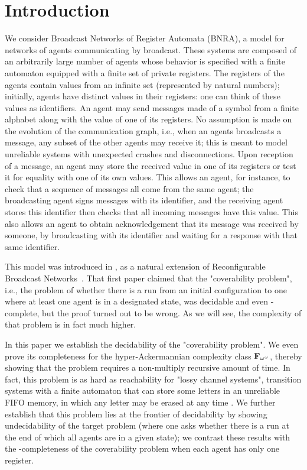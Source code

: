\section{Introduction}

We consider Broadcast Networks of Register Automata (BNRA), a model for networks of agents communicating by broadcast. These systems are composed of an arbitrarily large number of agents whose behavior is specified with a finite automaton equipped with a finite set of private registers. The registers of the agents contain values from an infinite set (represented by natural numbers); initially, agents have distinct values in their registers: one can think of these values as identifiers. An agent may send messages made of a symbol from a finite alphabet along with the value of one of its registers. No assumption is made on the evolution of the communication graph, i.e., when an agents broadcasts a message, any subset of the other agents may receive it; this is meant to model unreliable systems with unexpected crashes and disconnections. Upon reception of a message, an agent may store the received value in one of its registers or test it for equality with one of its own values. 
This allows an agent, for instance, to check that a sequence of messages all come from the same agent; the broadcasting agent signs messages with its identifier, and the receiving agent stores this identifier then checks that all incoming messages have this value. This also allows an agent to obtain acknowledgement that its message was received by someone, by broadcasting with its identifier and waiting for a response with that same identifier.

This model was introduced in \cite{DelzannoST13}, as a natural extension of Reconfigurable Broadcast Networks~\cite{DelzannoSZ2010Adhoc}. That first paper claimed that the "coverability problem", i.e., the problem of whether there is a run from an initial configuration to one where at least one agent is in a designated state, was decidable and even \PSPACE-complete, but the proof turned out to be wrong. As we will see, the complexity of that problem is in fact much higher.

In this paper we establish the decidability of the "coverability problem". We even prove its completeness for the hyper-Ackermannian complexity class $\mathbf{F}_{\omega^\omega}$, thereby showing that the problem requires a non-multiply recursive amount of time. In fact, this problem is as hard as reachability for "lossy channel systems", transition systems with a finite automaton that can store some letters in an unreliable FIFO memory, in which any letter may be erased at any time \cite{AbdullaJ1996verif, Schnoebelen2002verifying,ChambartS08ordinal}. 
We further establish that this problem lies at the frontier of decidability by showing undecidability of the target problem (where one asks whether there is a run at the end of which all agents are in a given state); we contrast these results with the \NP-completeness of the coverability problem when each agent has only one register. 


